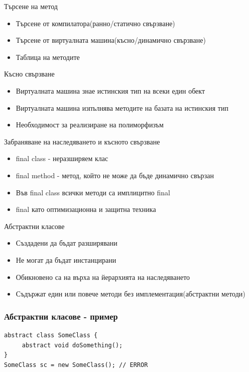 \documentclass{beamer}
\begin{document}
\begin{frame}{Търсене на метод}
  \transdissolve
  \begin{itemize}
  \item Търсене от компилатора(ранно/статично свързване)
  \item Търсене от виртуалната машина(късно/динамично свързване)
  \item Таблица на методите
  \end{itemize}
\end{frame}

\begin{frame}{Късно свързване}
  \transdissolve
  \begin{itemize}
  \item Виртуалната машина знае истинския тип на всеки един обект
  \item Виртуалната машина изпълнява методите на базата на истинския
    тип
  \item Необходимост за реализиране на полиморфизъм
  \end{itemize}
\end{frame}

\begin{frame}{Забраняване на наследяването и късното свързване}
  \transdissolve
  \begin{itemize}
  \item final class - неразширяем клас
  \item final method - метод, който не може да бъде динамично свързан
  \item Във final class всички методи са имплицитно final
  \item final като оптимизационна и защитна техника
  \end{itemize}
\end{frame}

\begin{frame}{Абстрактни класове}
  \transdissolve
  \begin{itemize}
  \item Създадени да бъдат разширявани
  \item Не могат да бъдат инстанцирани
  \item Обикновено са на върха на йерархията на наследяването
  \item Съдържат един или повече методи без имплементация(абстрактни методи)
  \end{itemize}
\end{frame}

\begin{frame}[fragile]
  \frametitle{Абстрактни класове - пример}
  \transdissolve
\begin{lstlisting}
abstract class SomeClass {
     abstract void doSomething();
}
SomeClass sc = new SomeClass(); // ERROR
\end{lstlisting}
\end{frame}
\end{document}

